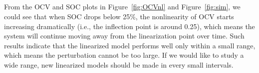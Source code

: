\documentclass[12pt]{article}
\begin{document}
\subsection{}
From the OCV and SOC plots in Figure~\ref{fig:OCVnl} and Figure~\ref{fig:sim}, we could see that when SOC drops below 25\%, the nonlinearity of OCV starts increasing dramatically (i.e., the inflection point is around 0.25), which means the system will continue moving away from the linearization point over time. Such results indicate that the linearized model performs well only within a small range, which means the perturbation cannot be too large. If we would like to study a wide range, new linearized models should be made in every small intervals. 
\end{document}
